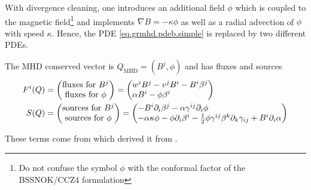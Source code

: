 \documentclass[a4paper]{article}
\newcommand{\desc}[1]{\text{#1}\quad}
\newcommand{\mhd}{\text{MHD}}
\newenvironment{pvector}{\begin{pmatrix*}[l]}{\end{pmatrix*}}
\begin{document}
With divergence cleaning, one introduces an additional field $\phi$
which is coupled to the magnetic field\footnote{Do not confuse the
symbol $\phi$ with the conformal factor of the BSSNOK/CCZ4 formulation}
and implements $\nabla B = - \kappa \phi$ as well as a radial advection
of $\phi$ with speed $\kappa$.
Hence, the PDE \eqref{eq.grmhd.pdeb.simple} is replaced by two
different PDEs.

The MHD conserved vector is $Q_\mhd = (B^j, \phi)$ and has
fluxes and sources
\begin{align}
F^i(Q) &= \begin{pmatrix}
\text{fluxes for }B^j \\
\text{fluxes for }\phi
\end{pmatrix}
=
\begin{pvector}
w^i B^j - v^j B^i - B^i \beta^j \\
\alpha B^i - \phi \beta^i
\end{pvector}
\\
S(Q) &=
\begin{pmatrix}
\text{sources for } B^j \\
\text{sources for } \phi
\end{pmatrix}
=
\begin{pvector}
-B^i \partial_i \beta^j - \alpha \gamma^{ij} \partial_i \phi \\
- \alpha \kappa \phi - \phi \partial_i \beta^i
- \frac 12 \phi \gamma^{ij} \beta^k \partial_k \gamma_{ij}
+ B^i \partial_i \alpha
\end{pvector}
\end{align}

These terms come from \cite{BHAC} which derived it from
\cite{divclean1, divclean2}.
\end{document}
